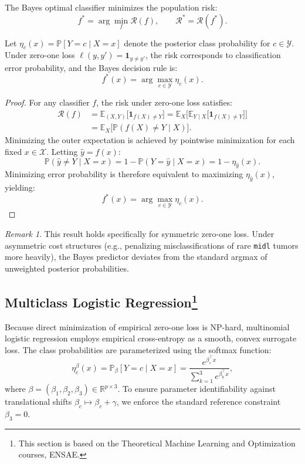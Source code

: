 \documentclass[a4paper,11pt]{paper}
\theoremstyle{plain}
\theoremstyle{definition}
\theoremstyle{remark}
\newtheorem{remark}[theorem]{Remark}
\begin{document}
The Bayes optimal classifier minimizes the population risk:
$$f^* = \arg\min_f \mathcal{R}(f), \qquad \mathcal{R}^* = \mathcal{R}(f^*).$$

Let $\eta_c(x) = \mathbb{P}[Y = c \mid X = x]$ denote the posterior class probability for $c \in \mathcal{Y}$. Under zero-one loss $\ell(y, y') = \mathbf{1}_{y \ne y'}$, the risk corresponds to classification error probability, and the Bayes decision rule is:
$$f^*(x) = \arg\max_{c \in \mathcal{Y}} \eta_c(x).$$

\begin{proof}
    For any classifier $f$, the risk under zero-one loss satisfies:
    \begin{align*}
        \mathcal{R}(f) & = \mathbb{E}_{(X, Y)}\big[\mathbf{1}_{f(X) \ne Y}\big] = \mathbb{E}_X\Big[\mathbb{E}_{Y \mid X}\big[\mathbf{1}_{f(X) \ne Y}\big]\Big] \\
                       & = \mathbb{E}_X\big[\mathbb{P}(f(X) \ne Y \mid X)\big].
    \end{align*}
    Minimizing the outer expectation is achieved by pointwise minimization for each fixed $x \in \mathcal{X}$. Letting $\hat y = f(x)$:
    $$\mathbb{P}(\hat y \ne Y \mid X = x) = 1 - \mathbb{P}(Y = \hat y \mid X = x) = 1 - \eta_{\hat y}(x).$$
    Minimizing error probability is therefore equivalent to maximizing $\eta_{\hat y}(x)$, yielding:
    \[
        f^*(x) = \arg\max_{c \in \mathcal{Y}} \eta_c(x).
    \]
\end{proof}

\begin{remark}
    This result holds specifically for symmetric zero-one loss. Under asymmetric cost structures (e.g., penalizing misclassifications of rare \texttt{midl} tumors more heavily), the Bayes predictor deviates from the standard argmax of unweighted posterior probabilities.
\end{remark}

\subsection{Multiclass Logistic Regression\texorpdfstring{\protect\footnote{This section is based on the Theoretical Machine Learning and Optimization courses, ENSAE.}}{}}
\label{sec:logreg}

Because direct minimization of empirical zero-one loss is NP-hard, multinomial logistic regression employs empirical cross-entropy as a smooth, convex surrogate loss. The class probabilities are parameterized using the softmax function:
$$\eta_c^\beta(x) = \mathbb{P}_\beta[Y = c \mid X = x] = \frac{e^{\beta_c^\top x}}{\sum_{k=1}^3 e^{\beta_k^\top x}},$$
where $\beta = (\beta_1, \beta_2, \beta_3) \in \mathbb{R}^{p \times 3}$. To ensure parameter identifiability against translational shifts $\beta_c \mapsto \beta_c + \gamma$, we enforce the standard reference constraint $\beta_3 = 0$.
\end{document}

